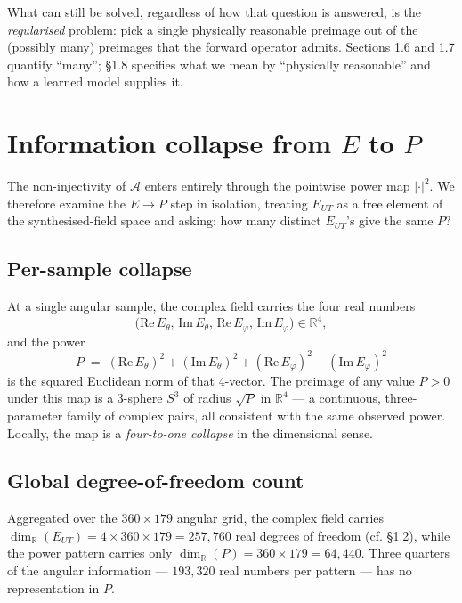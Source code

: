 \documentclass[11pt,a4paper]{report}
\begin{document}
What can still be solved, regardless of how that question is answered, is the
\emph{regularised} problem: pick a single physically reasonable preimage out of the
(possibly many) preimages that the forward operator admits. Sections 1.6 and 1.7
quantify \enquote{many}; \S1.8 specifies what we mean by
\enquote{physically reasonable} and how a learned model supplies it.
\section{\texorpdfstring{Information collapse from $E$ to $P$}{Information collapse from E to P}}

The non-injectivity of $\mathcal{A}$ enters entirely through the pointwise power map
$|\cdot|^2$. We therefore examine the $E\to P$ step in isolation, treating $E_{UT}$
as a free element of the synthesised-field space and asking: how many distinct
$E_{UT}$'s give the same $P$?

\subsection*{Per-sample collapse}

At a single angular sample, the complex field carries the four real numbers
\[
\bigl(\mathrm{Re}\,E_\theta,\,\mathrm{Im}\,E_\theta,\,\mathrm{Re}\,E_\varphi,\,\mathrm{Im}\,E_\varphi\bigr)\in\mathbb{R}^4,
\]
and the power
\[
P \;=\; (\mathrm{Re}\,E_\theta)^2 + (\mathrm{Im}\,E_\theta)^2 + (\mathrm{Re}\,E_\varphi)^2 + (\mathrm{Im}\,E_\varphi)^2
\]
is the squared Euclidean norm of that 4-vector. The preimage of any value $P>0$
under this map is a 3-sphere $S^3$ of radius $\sqrt{P}$ in $\mathbb{R}^4$ --- a
continuous, three-parameter family of complex pairs, all consistent with the same
observed power. Locally, the map is a \emph{four-to-one collapse} in the
dimensional sense.

\subsection*{Global degree-of-freedom count}

Aggregated over the $360\times 179$ angular grid, the complex field carries
$\dim_\mathbb{R}(E_{UT}) = 4\times 360\times 179 = 257{,}760$ real degrees of freedom
(cf. \S1.2), while the power pattern carries only
$\dim_\mathbb{R}(P) = 360\times 179 = 64{,}440$. Three quarters of the angular
information --- $193{,}320$ real numbers per pattern --- has no representation in $P$.
\end{document}
